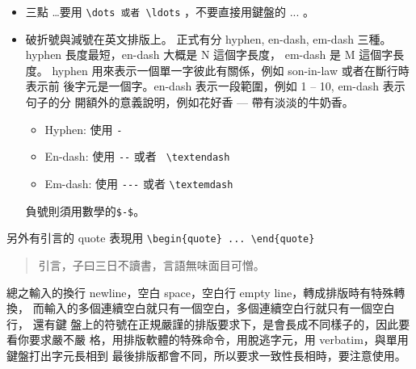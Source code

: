 \begin{itemize}
      用 verbatim 原型變成\\\\
      \verb= `倒引號`=, \verb=`排版單引號'=, \verb='錯誤單引號'=，
      \verb=``排版雙引號''=, \verb="錯誤雙引號"=\\\\
    \item 三點 \dots 要用 \verb=\dots 或者 \ldots= ，不要直接用鍵盤的 ... 。
    \item 破折號與減號在英文排版上。 正式有分 hyphen, en-dash, em-dash 三種。
      hyphen 長度最短，en-dash 大概是 N 這個字長度， em-dash 是 M 這個字長度。
      hyphen 用來表示一個單一字彼此有關係，例如 son-in-law 或者在斷行時表示前
      後字元是一個字。en-dash 表示一段範圍，例如 1 -- 10, em-dash 表示句子的分
      開額外的意義說明，例如花好香 --- 帶有淡淡的牛奶香。
      \begin{itemize}
        \item Hyphen: 使用 \verb=-=
        \item En-dash: 使用 \verb=--= 或者 \verb= \textendash=
        \item Em-dash: 使用 \verb=---= 或者 \verb=\textemdash=
      \end{itemize}
      負號則須用數學的\verb=$-$=。
  \end{itemize}
  另外有引言的 quote 表現用 \verb=\begin{quote} ... \end{quote}=
  \begin{quote}
  引言，子曰三日不讀書，言語無味面目可憎。
  \end{quote}
  總之輸入的換行 newline，空白 space，空白行 empty line，轉成排版時有特殊轉換，
  而輸入的多個連續空白就只有一個空白，多個連續空白行就只有一個空白行， 還有鍵
  盤上的符號在正規嚴謹的排版要求下，是會長成不同樣子的，因此要看你要求嚴不嚴
  格，用排版軟體的特殊命令，用脫逃字元，用 verbatim，與單用鍵盤打出字元長相到
  最後排版都會不同，所以要求一致性長相時，要注意使用。

